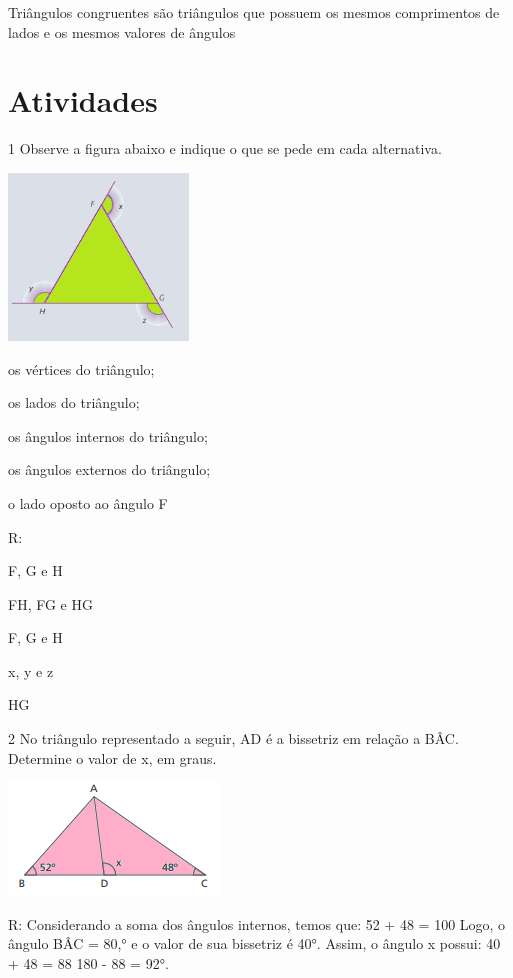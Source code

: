 {Triângulos congruentes são triângulos que possuem os mesmos comprimentos
de lados e os mesmos valores de ângulos

\section{Atividades}

\num{1} Observe a figura abaixo e indique o que se pede em cada alternativa.

\includegraphics[width=1.88333in,height=1.75048in]{./imgSAEB_8_MAT/media/image13.png}
\item os vértices do triângulo;
\item os lados do triângulo;
\item os ângulos internos do triângulo;
\item os ângulos externos do triângulo;
\item o lado oposto ao ângulo F

R:
\item F, G e H
\item FH, FG e HG
\item F, G e H
\item x, y e z
\item HG

\num{2} No triângulo representado a seguir, AD é a bissetriz em relação a
BÂC. Determine o valor de x, em graus.

\includegraphics[width=2.20833in,height=1.1875in]{./imgSAEB_8_MAT/media/image14.png}

R: Considerando a soma dos ângulos internos, temos que:
52 + 48 = 100
Logo, o ângulo BÂC = 80,° e o valor de sua bissetriz é 40°.
Assim, o ângulo x possui:
40 + 48 = 88
180 - 88 = 92°.

}
